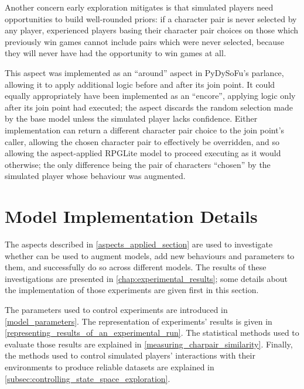 Another concern early exploration mitigates is that simulated players need
opportunities to build well-rounded priors: if a character pair is never
selected by any player, experienced players basing their character pair choices
on those which previously win games cannot include pairs which were never
selected, because they will never have had the opportunity to win games at all.

This aspect was implemented as an ``around'' aspect in PyDySoFu's parlance,
allowing it to apply additional logic before and after its join point. It could
equally appropriately have been implemented as an ``encore'', applying logic
only after its join point had executed; the aspect discards the random selection
made by the base model unless the simulated player lacks confidence. Either
implementation can return a different character pair choice to the join point's
caller, allowing the chosen character pair to effectively be overridden, and so
allowing the aspect-applied RPGLite model to proceed executing as it would
otherwise; the only difference being the pair of characters ``chosen'' by the
simulated player whose behaviour was augmented.





\section{Model Implementation Details}
\label{sec:optimisation_with_aspects_experimental_design}

The aspects described in \cref{aspects_applied_section} are used to investigate
whether \aop{} can be used to augment models, add new behaviours and parameters
to them, and successfully do so across different models. The results of these
investigations are presented in \cref{chap:experimental_results}; some details
about the implementation of those experiments are given first in this section.

The parameters used to control experiments are introduced in
\cref{model_parameters}. The representation of experiments' results is given in
\cref{representing_results_of_an_experimental_run}. The statistical methods used
to evaluate those results are explained in \cref{measuring_charpair_similarity}.
Finally, the methods used to control simulated players' interactions with their
environments to produce reliable datasets are explained in
\cref{subsec:controlling_state_space_exploration}.



